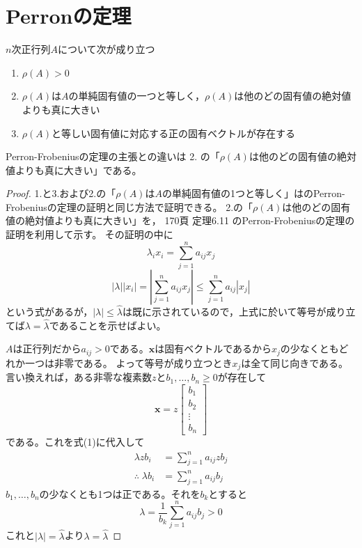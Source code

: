     \section{Perronの定理}
        \begin{shadebox}
            $n$次正行列$A$について次が成り立つ
            \begin{enumerate}
                \item $\rho(A)>0$
                \item $\rho(A)$は$A$の単純固有値の一つと等しく，$\rho(A)$は他のどの固有値の絶対値よりも真に大きい
                \item $\rho(A)$と等しい固有値に対応する正の固有ベクトルが存在する
            \end{enumerate}
        \end{shadebox}
        Perron-Frobeniusの定理の主張との違いは 2. の「$\rho(A)$は他のどの固有値の絶対値よりも真に大きい」である。
        \begin{proof}
            \quad\par
            1.と3.および2.の「$\rho(A)$は$A$の単純固有値の1つと等しく」は\cite{システム線形代数}のPerron-Frobeniusの定理の証明と同じ方法で証明できる。
            2.の「$\rho(A)$は他のどの固有値の絶対値よりも真に大きい」を，\cite{システム線形代数} 170頁 定理6.11 のPerron-Frobeniusの定理の証明を利用して示す。
            その証明の中に
            \begin{equation}
                \lambda_ix_i = \sum_{j=1}^{n}{a_{ij}x_j}
            \end{equation}
            \[|\lambda||x_i| = \left|\sum_{j=1}^{n}{a_{ij}x_j}\right| \leq \sum_{j=1}^{n}{a_{ij}|x_j|}\]
            という式があるが，$|\lambda|\leq\hat{\lambda}$は既に示されているので，上式に於いて等号が成り立てば$\lambda=\hat{\lambda}$であることを示せばよい。
            \par
            $A$は正行列だから$a_{ij}>0$である。$\bm{x}$は固有ベクトルであるから$x_j$の少なくともどれか一つは非零である。
            よって等号が成り立つとき$x_j$は全て同じ向きである。
            言い換えれば，ある非零な複素数$z$と$b_1,\dotsc,b_n\geq0$が存在して
            \[
                \bm{x} = z
                \begin{bmatrix}
                    b_1\\
                    b_2\\
                    \vdots\\
                    b_n
                \end{bmatrix}
            \]
            である。これを式(1)に代入して
            \begin{align*}
                \lambda zb_i &= \sum_{j=1}^{n}{a_{ij}zb_j}\\
                \therefore\; \lambda b_i &= \sum_{j=1}^{n}{a_{ij}b_j}
            \end{align*}
            $b_1,\dotsc,b_n$の少なくとも1つは正である。それを$b_k$とすると
            \[\lambda = \frac{1}{b_k}\sum_{j=1}^{n}{a_{ij}b_j} > 0\]
            これと$|\lambda|=\hat{\lambda}$より$\lambda=\hat{\lambda}$
        \end{proof}